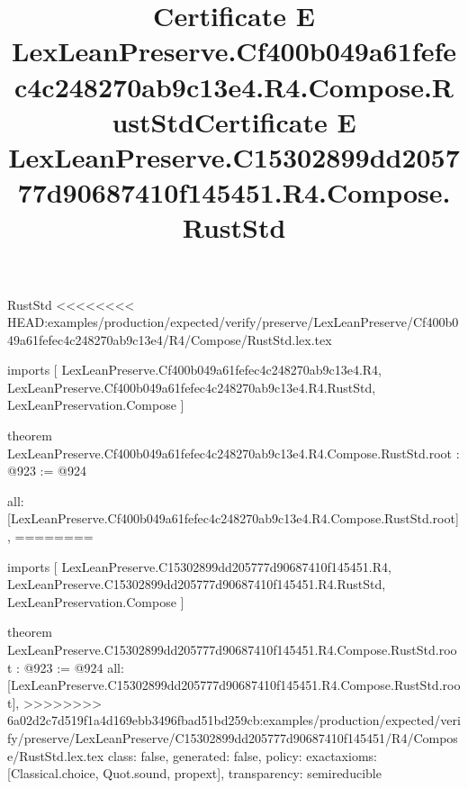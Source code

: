 \begin{lexlean}{RustStd}
<<<<<<<< HEAD:examples/production/expected/verify/preserve/LexLeanPreserve/Cf400b049a61fefec4c248270ab9c13e4/R4/Compose/RustStd.lex.tex
\title{Certificate E LexLeanPreserve.Cf400b049a61fefec4c248270ab9c13e4.R4.Compose.RustStd}
\begin{coremodule}
imports [
  LexLeanPreserve.Cf400b049a61fefec4c248270ab9c13e4.R4,
  LexLeanPreserve.Cf400b049a61fefec4c248270ab9c13e4.R4.RustStd,
  LexLeanPreservation.Compose
]

theorem LexLeanPreserve.Cf400b049a61fefec4c248270ab9c13e4.R4.Compose.RustStd.root : @923 := @924 {
  all: [LexLeanPreserve.Cf400b049a61fefec4c248270ab9c13e4.R4.Compose.RustStd.root],
========
\title{Certificate E LexLeanPreserve.C15302899dd205777d90687410f145451.R4.Compose.RustStd}
\begin{coremodule}
imports [
  LexLeanPreserve.C15302899dd205777d90687410f145451.R4,
  LexLeanPreserve.C15302899dd205777d90687410f145451.R4.RustStd,
  LexLeanPreservation.Compose
]

theorem LexLeanPreserve.C15302899dd205777d90687410f145451.R4.Compose.RustStd.root : @923 := @924 {
  all: [LexLeanPreserve.C15302899dd205777d90687410f145451.R4.Compose.RustStd.root],
>>>>>>>> 6a02d2c7d519f1a4d169ebb3496fbad51bd259cb:examples/production/expected/verify/preserve/LexLeanPreserve/C15302899dd205777d90687410f145451/R4/Compose/RustStd.lex.tex
  class: false,
  generated: false,
  policy: exact{axioms: [Classical.choice, Quot.sound, propext]},
  transparency: semireducible
}


\end{coremodule}}
\end{coremodule}
\end{lexlean}
